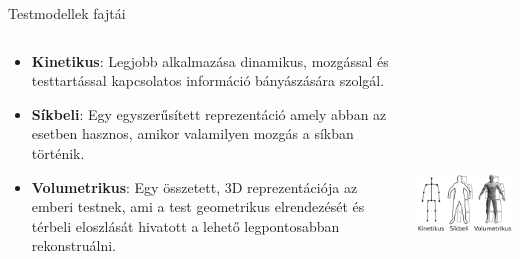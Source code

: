 \documentclass[english, aspectratio=169]{beamer}
\begin{document}
\begin{frame}{Testmodellek fajtái}
\begin{columns}
\begin{column}{.5\textwidth}
\begin{itemize}
	\item \textbf{Kinetikus}: Legjobb alkalmazása dinamikus, mozgással és testtartással kapcsolatos információ bányászására szolgál. 
	\item \textbf{Síkbeli}: Egy egyszerűsített reprezentáció amely abban az esetben hasznos, amikor valamilyen mozgás a síkban történik. 
	\item \textbf{Volumetrikus}: Egy összetett, 3D reprezentációja az emberi testnek, ami a test geometrikus elrendezését és térbeli eloszlását hivatott a lehető legpontosabban rekonstruálni. 
\end{itemize}
\end{column}
\begin{column}{.5\textwidth}
\begin{center}
\includegraphics[height=8cm, width=7cm, keepaspectratio]{images/instance_25.png}
\end{center}
\end{column}
\end{columns}
\end{frame}
\end{document}

